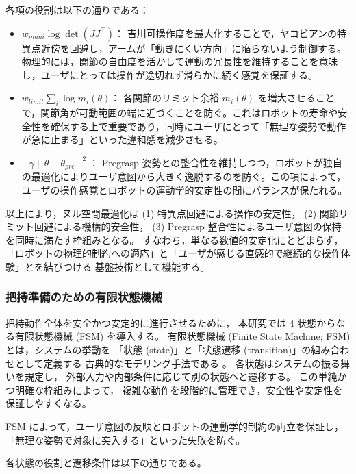 \documentclass[../../main.tex]{subfiles} %
\begin{document}
各項の役割は以下の通りである：
\begin{itemize}
 \item $w_{mani}\log\det(JJ^\top)$：
  吉川可操作度\cite{Yoshikawa}を最大化することで，ヤコビアンの特異点近傍を回避し，アームが「動きにくい方向」に陥らないよう制御する。物理的には，関節の自由度を活かして運動の冗長性を維持することを意味し，ユーザにとっては操作が途切れず滑らかに続く感覚を保証する。

 \item $w_{limit}\sum_i \log m_i(\theta)$：
  各関節のリミット余裕 $m_i(\theta)$ \cite{JointLimit}を増大させることで，関節角が可動範囲の端に近づくことを防ぐ。これはロボットの寿命や安全性を確保する上で重要であり，同時にユーザにとって「無理な姿勢で動作が急に止まる」といった違和感を減少させる。

 \item $-\gamma\|\theta-\theta_{pre}\|^2$：
  Pregrasp 姿勢との整合性を維持しつつ，ロボットが独自の最適化によりユーザ意図から大きく逸脱するのを防ぐ。この項によって，ユーザの操作感覚とロボットの運動学的安定性の間にバランスが保たれる。
\end{itemize}

以上により，ヌル空間最適化は
(1) 特異点回避による操作の安定性，
(2) 関節リミット回避による機構的安全性，
(3) Pregrasp 整合性によるユーザ意図の保持
を同時に満たす枠組みとなる。
すなわち，単なる数値的安定化にとどまらず，
「ロボットの物理的制約への適応」と「ユーザが感じる直感的で継続的な操作体験」とを結びつける
基盤技術として機能する。


\subsubsection{把持準備のための有限状態機械}
把持動作全体を安全かつ安定的に進行させるために，
本研究では 4 状態からなる有限状態機械 (FSM) を導入する。
有限状態機械 (Finite State Machine; FSM) とは，システムの挙動を
「状態 (state)」と「状態遷移 (transition)」の組み合わせとして定義する
古典的なモデリング手法である\cite{FSM1} \cite{FSM2}。
各状態はシステムの振る舞いを規定し，
外部入力や内部条件に応じて別の状態へと遷移する。
この単純かつ明確な枠組みによって，
複雑な動作を段階的に管理でき，安全性や安定性を保証しやすくなる。

FSM によって，ユーザ意図の反映とロボットの運動学的制約の両立を保証し，
「無理な姿勢で対象に突入する」といった失敗を防ぐ。

各状態の役割と遷移条件は以下の通りである。
\end{document}
